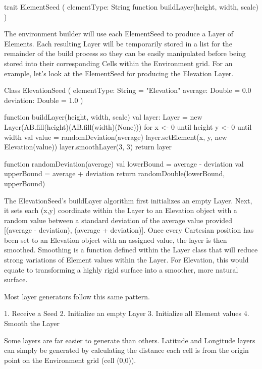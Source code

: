 trait ElementSeed (
  elementType: String
  function buildLayer(height, width, scale)
)

The environment builder will use each ElementSeed to produce a Layer of Elements.
Each resulting Layer will be temporarily stored in a list for the remainder of the build process so they can be easily manipulated before being stored into their corresponding Cells within the Environment grid.
For an example, let’s look at the ElementSeed for producing the Elevation Layer.

Class ElevationSeed (
	elementType: String = "Elevation"
  average: Double = 0.0
  deviation: Double = 1.0
) {
  function buildLayer(height, width, scale) {
    val layer: Layer = new Layer(AB.fill(height)(AB.fill(width)(None)))
    for {
      x <- 0 until height
      y <- 0 until width
    } {
      val value = randomDeviation(average)
      layer.setElement(x, y, new Elevation(value))
    }
    layer.smoothLayer(3, 3)
    return layer
  }

  function randomDeviation(average) {
    val lowerBound = average - deviation
    val upperBound = average + deviation
    return randomDouble(lowerBound, upperBound)
  }
}


The ElevationSeed’s buildLayer algorithm first initializes an empty Layer.
Next, it sets each (x,y) coordinate within the Layer to an Elevation object with a random value between a standard deviation of the average value provided [(average - deviation), (average + deviation)].
Once every Cartesian position has been set to an Elevation object with an assigned value, the layer is then smoothed.
Smoothing is a function defined within the Layer class that will reduce strong variations of Element values within the Layer.
For Elevation, this would equate to transforming a highly rigid surface into a smoother, more natural surface.


Most layer generators follow this same pattern.

1.	Receive a Seed
2.	Initialize an empty Layer
3.	Initialize all Element values
4.	Smooth the Layer

Some layers are far easier to generate than others.
Latitude and Longitude layers can simply be generated by calculating the distance each cell is from the origin point on the Environment grid (cell (0,0)).


